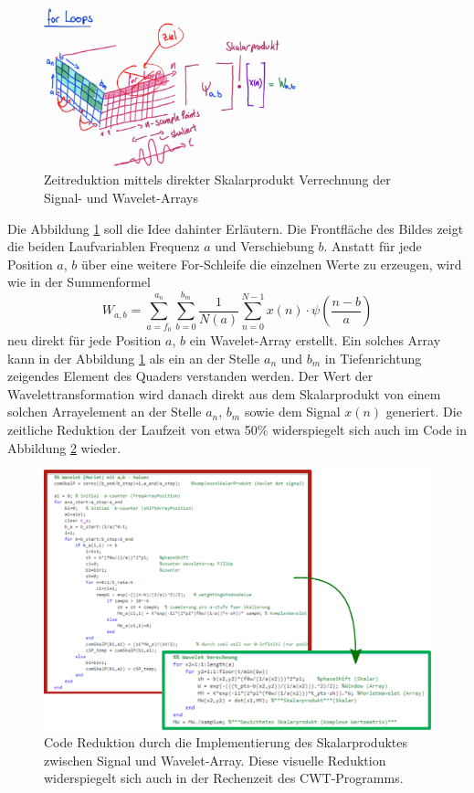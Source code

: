 \begin{figure}
	\centering
	\includegraphics[width=0.65\textwidth]{papers/wavelets/images/14-1_EliminationForLoops.png}
	\caption{Zeitreduktion mittels direkter Skalarprodukt
	Verrechnung der Signal- und Wavelet-Arrays}
	\label{wavelet:fig:EliminationForLoops}
\end{figure}

Die Abbildung \ref{wavelet:fig:EliminationForLoops} soll die Idee
dahinter Erläutern.
Die Frontfläche des Bildes zeigt die beiden Laufvariablen Frequenz
$a$ und Verschiebung $b$.
Anstatt für jede Position $a$, $b$ über eine weitere For-Schleife
die einzelnen Werte zu erzeugen, wird wie in der Summenformel
\[
W_{a,b}
=
\sum_{a=f_0}^{a_n}\sum_{b=0}^{b_m}\frac{1}{N(a)}\sum_{n=0}^{N-1}
x(n)\cdot\psi\left(\frac{n-b}{a}\right)
\]
neu direkt für jede Position $a$, $b$ ein Wavelet-Array erstellt.
Ein solches Array kann in der Abbildung
\ref{wavelet:fig:EliminationForLoops} als ein an der Stelle $a_n$
und $b_m$ in Tiefenrichtung zeigendes Element des Quaders verstanden
werden.
Der Wert der Wavelettransformation wird danach direkt aus dem
Skalarprodukt von einem solchen Arrayelement an der Stelle $a_n$,
$b_m$ sowie dem Signal $x(n)$ generiert.
Die zeitliche Reduktion der Laufzeit von etwa 50\% widerspiegelt
sich auch im Code in Abbildung \ref{wavelet:fig:EliminationForLoopCode}
wieder.

\begin{figure}
	\centering
	\includegraphics[width=\textwidth]{papers/wavelets/images/14-2_CodeSkalarProd.png}
	\caption{Code Reduktion durch die Implementierung des
	Skalarproduktes zwischen Signal und Wavelet-Array.
	Diese visuelle Reduktion widerspiegelt sich auch in der
	Rechenzeit des CWT-Programms.}
	\label{wavelet:fig:EliminationForLoopCode}
\end{figure}

